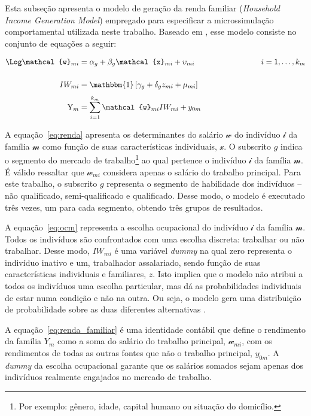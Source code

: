 Esta subseção apresenta o modelo de geração da renda familiar (\textit{Household Income Generation Model}) empregado para especificar a microssimulação comportamental utilizada neste trabalho. Baseado em \textcite{bourguignon05}, esse modelo consiste no conjunto de equações a seguir:

\begin{align}
	\Log \mathcal{w}_{mi}  &= \alpha_{g} + \beta_{g} \mathcal{x}_{mi} + \upsilon_{mi} \hspace{3cm} i = 1, \ldots, k_m \label{eq:renda} \\[0.5cm]
	IW_{mi}                &= \mathbbm{1} \left[\gamma_{g} + \delta_{g} z_{mi} + \mu_{mi} \right] \label{eq:ocm} \\[0.1cm]
	\text{Y}_{m}           &= \sum_{i = 1}^{k_{m}} \mathcal{w}_{mi} IW_{mi} + y_{0m} \label{eq:renda_familiar}
\end{align}

A equação~\eqref{eq:renda} apresenta os determinantes do salário $\mathcal{w}$ do indivíduo $\mathcal{i}$ da família $\mathcal{m}$ como função de suas características individuais, $\mathcal{x}$. O subscrito $g$ indica o segmento do mercado de trabalho\footnote{Por exemplo: gênero, idade, capital humano ou situação do domicílio.} ao qual pertence o indivíduo $\mathcal{i}$ da família $\mathcal{m}$. É válido ressaltar que  $\mathcal{w}_{mi}$ considera apenas o salário do trabalho principal. Para este trabalho, o subscrito $g$ representa o segmento de habilidade dos indivíduos -- não qualificado, semi-qualificado e qualificado. Desse modo, o modelo é executado três vezes, um para cada segmento, obtendo três grupos de resultados.

A equação~\eqref{eq:ocm} representa a escolha ocupacional do indivíduo $\mathcal{i}$ da família $\mathcal{m}$. Todos os indivíduos são confrontados com uma escolha discreta: trabalhar ou não trabalhar. Desse modo, $IW_{mi}$ é uma variável \textit{dummy} na qual zero representa o indivíduo inativo e um, trabalhador assalariado, sendo função de suas características individuais e familiares, $z$. Isto implica que o modelo não atribui a todos os indivíduos uma escolha particular, mas dá as probabilidades individuais de estar numa condição e não na outra. Ou seja, o modelo gera uma distribuição de probabilidade sobre as duas diferentes alternativas \cite{colombo08}.

A equação~\eqref{eq:renda_familiar} é uma identidade contábil que define o rendimento da família $Y_m$ como a soma do salário do trabalho principal, $\mathcal{w}_{mi}$, com os rendimentos de todas as outras fontes que não o trabalho principal, $y_{0m}$. A \textit{dummy} da escolha ocupacional garante que os salários somados sejam apenas dos indivíduos realmente engajados no mercado de trabalho.

